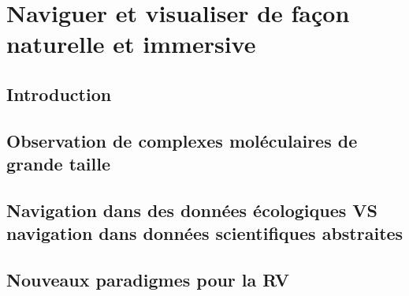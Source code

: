 \chapter[Exploration interactive de données moléculaire en immersion]{Naviguer et visualiser de façon naturelle et immersive}
\label{Sec:CantorDigitalis}
\minitoc
\cleardoublepage

\section{Introduction}

\section{Observation de complexes moléculaires de grande taille}

\section{Navigation dans des données écologiques VS navigation dans données scientifiques abstraites}

\section{Nouveaux paradigmes pour la RV}